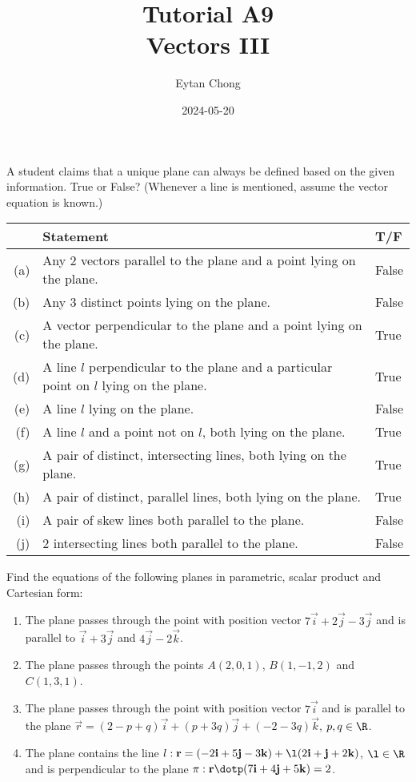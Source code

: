 \documentclass{echw}
\title{Tutorial A9\\Vectors III}
\author{Eytan Chong}
\date{2024-05-20}
\begin{document}
    \problem{}
        A student claims that a unique plane can always be defined based on the given information. True or False? (Whenever a line is mentioned, assume the vector equation is known.)

        \begin{table}[h]
            \centering
            \begin{tabularx}{\textwidth}{r X l}
            & \textbf{Statement} & \textbf{T/F}\\\hline
            (a) & Any 2 vectors parallel to the plane and a point lying on the plane. & False \\
            (b) & Any 3 distinct points lying on the plane. & False \\
            (c) & A vector perpendicular to the plane and a point lying on the plane. & True\\
            (d) & A line $l$ perpendicular to the plane and a particular point on $l$ lying on the plane. & True\\
            (e) & A line $l$ lying on the plane. & False\\
            (f) & A line $l$ and a point not on $l$, both lying on the plane. & True\\
            (g) & A pair of distinct, intersecting lines, both lying on the plane. & True\\
            (h) & A pair of distinct, parallel lines, both lying on the plane. & True\\
            (i) & A pair of skew lines both parallel to the plane. & False\\
            (j) & 2 intersecting lines both parallel to the plane. & False
            \end{tabularx}
        \end{table}

    \problem{}
        Find the equations of the following planes in parametric, scalar product and Cartesian form:

        \begin{enumerate}
            \item The plane passes through the point with position vector $7\vec i + 2 \vec j -3\vec j$ and is parallel to $\vec i + 3\vec j$ and $4\vec j - 2\vec k$.
            \item The plane passes through the points $A(2, 0, 1)$, $B(1, -1, 2)$ and $C(1, 3, 1)$.
            \item The plane passes through the point with position vector $7\vec i$ and is parallel to the plane $\vec r = (2 - p + q)\vec i + (p + 3q)\vec j + (-2-3q)\vec k$, $p, q \in \R$.
            \item The plane contains the line $l : \vec r = (-2\vec i + 5\vec j -3\vec k) + \l(2\vec i + \vec j + 2\vec k)$, $\l \in \R$ and is perpendicular to the plane $\pi : \vec r \dotp (7\vec i + 4\vec j + 5\vec k) = 2$.
        \end{enumerate}
\end{document}
